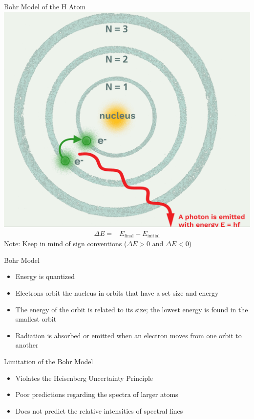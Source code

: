 \documentclass[11pt]{beamer}
\begin{document}
\begin{frame}{Bohr Model of the H Atom}
  \centering
  \includegraphics[width=0.55\linewidth]{bohr_model}
  \begin{align}
    \Delta E = & E_\text{final} - E_\text{initial}
  \end{align}
  Note: Keep in mind of sign conventions ($\Delta E > 0$ and
  $\Delta E < 0$)
\end{frame}

\begin{frame}{Bohr Model}
  \begin{itemize}
  \item Energy is quantized
  \item Electrons orbit the nucleus in orbits that have
    a set size and energy
  \item The energy of the orbit is related to its size; the
    lowest energy is found in the smallest orbit
  \item Radiation is absorbed or emitted when an electron
    moves from one orbit to another
  \end{itemize}
\end{frame}

\begin{frame}{Limitation of the Bohr Model}
  \begin{itemize}
  \item Violates the Heisenberg Uncertainty Principle
  \item Poor predictions regarding the spectra of larger
    atoms
  \item Does not predict the relative intensities of spectral
    lines
  \end{itemize}
\end{frame}
\end{document}
